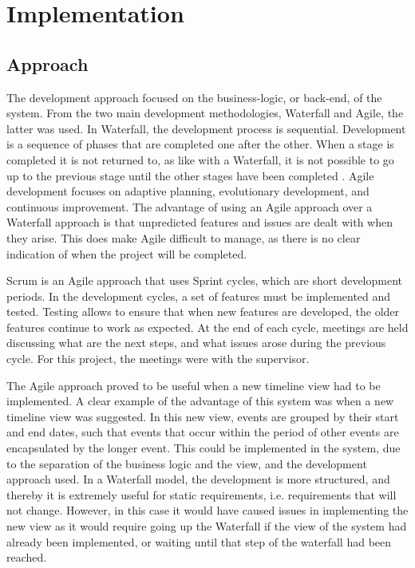 \chapter{Implementation}
\section{Approach}
\par The development approach focused on the business-logic, or back-end, of the system. From the two main development methodologies, Waterfall and Agile, the latter was used. In Waterfall, the development process is sequential. Development is a sequence of phases that are completed one after the other. When a stage is completed it is not returned to, as like with a Waterfall, it is not possible to go up to the previous stage until the other stages have been completed	. Agile development focuses on adaptive planning, evolutionary development, and continuous improvement. The advantage of using an Agile approach over a Waterfall approach is that unpredicted features and issues are dealt with when they arise. This does make Agile difficult to manage, as there is no clear indication of when the project will be completed.
 
\par Scrum is an Agile approach that uses Sprint cycles, which are short development periods. In the development cycles, a set of features must be implemented and tested. Testing allows to ensure that when new features are developed, the older features continue to work as expected. At the end of each cycle, meetings are held discussing what are the next steps, and what issues arose during the previous cycle. For this project, the meetings were with the supervisor.
 
\par The Agile approach proved to be useful when a new timeline view had to be implemented. A clear example of the advantage of this system was when a new timeline view was suggested. In this new view, events are grouped by their start and end dates, such that events that occur within the period of other events are encapsulated by the longer event. This could be implemented in the system, due to the separation of the business logic and the view, and the development approach used. In a Waterfall model, the development is more structured, and thereby it is extremely useful for static requirements, i.e. requirements that will not change. However, in this case it would have caused issues in implementing the new view as it would require going up the Waterfall if the view of the system had already been implemented, or waiting until that step of the waterfall had been reached.

